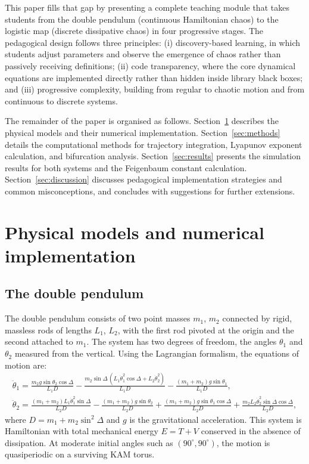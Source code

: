 \documentclass[aps,twocolumn,showpacs]{revtex4-2}
\begin{document}
This paper fills that gap by presenting a complete teaching module that takes students from the double
pendulum (continuous Hamiltonian chaos) to the logistic map (discrete dissipative chaos) in four progressive
stages. The pedagogical design follows three principles: (i) discovery-based learning, in which students
adjust parameters and observe the emergence of chaos rather than passively receiving definitions; (ii) code
transparency, where the core dynamical equations are implemented directly rather than hidden inside library
black boxes; and (iii) progressive complexity, building from regular to chaotic motion and from continuous
to discrete systems.

The remainder of the paper is organised as follows. Section~\ref{sec:models} describes the physical models
and their numerical implementation. Section~\ref{sec:methods} details the computational methods for
trajectory integration, Lyapunov exponent calculation, and bifurcation analysis. Section~\ref{sec:results}
presents the simulation results for both systems and the Feigenbaum constant calculation.
Section~\ref{sec:discussion} discusses pedagogical implementation strategies and common misconceptions,
and concludes with suggestions for further extensions.

\section{Physical models and numerical implementation}
\label{sec:models}

\subsection{The double pendulum}

The double pendulum consists of two point masses $m_1$, $m_2$ connected by rigid, massless rods of lengths
$L_1$, $L_2$, with the first rod pivoted at the origin and the second attached to $m_1$. The system has
two degrees of freedom, the angles $\theta_1$ and $\theta_2$ measured from the vertical. Using the
Lagrangian formalism, the equations of motion are:
\begin{gather}
\ddot\theta_1 =
\frac{m_2 g \sin\theta_2 \cos\Delta}{L_1 D}
- \frac{m_2\sin\Delta\,(L_1\dot\theta_1^2\cos\Delta + L_2\dot\theta_2^2)}{L_1 D}
- \frac{(m_1+m_2)g\sin\theta_1}{L_1 D},
\label{eq:theta1}\\[4pt]
\ddot\theta_2 =
\frac{(m_1+m_2)L_1\dot\theta_1^2\sin\Delta}{L_2 D}
- \frac{(m_1+m_2)g\sin\theta_2}{L_2 D}
+ \frac{(m_1+m_2)g\sin\theta_1\cos\Delta}{L_2 D}
+ \frac{m_2 L_2\dot\theta_2^2\sin\Delta\cos\Delta}{L_2 D},
\label{eq:theta2}
\end{gather}
where $D = m_1 + m_2\sin^2\Delta$ and $g$ is the gravitational acceleration. This system is Hamiltonian
with total mechanical energy $E = T + V$ conserved in the absence of dissipation. At moderate initial angles such as $(90^\circ,90^\circ)$, the motion is quasiperiodic on a surviving KAM torus.
\end{document}
